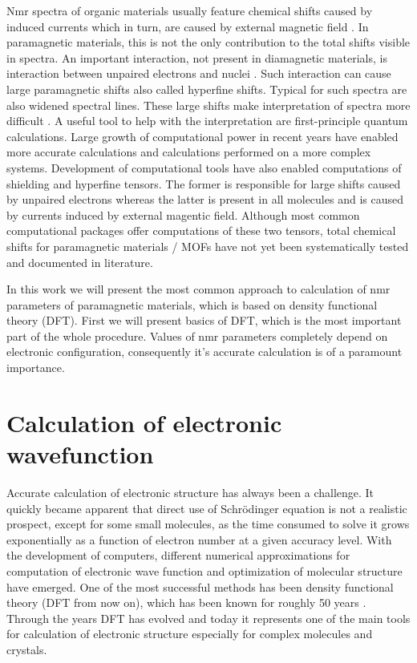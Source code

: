 \documentclass[openany, longbibliography,slovene,a4paper,12pt]{article}
\begin{document}
 Nmr spectra of organic materials usually feature chemical shifts caused by
 induced currents which in turn, are caused by external magnetic field
 \cite{chemic_shift_tensor_review}. In paramagnetic materials, this is not the
 only contribution to the total shifts visible in spectra. An important
 interaction, not present in  diamagnetic materials, is interaction between
 unpaired electrons and nuclei
 \cite{Dft_Investigation_of_the_Effect_of_Spin_Orbit}.
 Such interaction can cause large paramagnetic
 shifts also called hyperfine shifts. Typical for such spectra are also widened
 spectral lines. These large shifts make interpretation of spectra more difficult
 \cite{Dft_Investigation_of_the_Effect_of_Spin_Orbit}. A useful tool to help
 with the interpretation are first-principle quantum calculations. Large growth
 of computational power in recent years have enabled more accurate calculations
 and calculations performed on a more complex systems. Development of
 computational tools have also enabled computations of shielding and hyperfine
 tensors. The former is responsible for large shifts caused by unpaired
 electrons whereas the latter is present in all molecules and is caused by
 currents induced by external magentic field. Although most common computational
 packages offer computations of these two tensors, total chemical shifts for paramagnetic materials / MOFs have not yet been systematically tested and documented in literature.

 In this work we will present the most common approach to calculation of nmr
 parameters of paramagnetic materials,  which is based on density functional
 theory (DFT). First we  will present basics of DFT, which is the most important part of the whole procedure. Values of nmr parameters completely depend on electronic configuration, consequently it's accurate calculation is of a paramount importance. 

\section{Calculation of electronic wavefunction}
Accurate calculation of electronic structure has always been a challenge. It
quickly became apparent that direct use of Schr{\"o}dinger equation is not a
realistic prospect, except for some small
molecules, as the time consumed to solve it grows exponentially
\cite{nobel_lecture} as a function of electron
number at a given accuracy level. With the development of computers, different
numerical approximations for computation of electronic wave function and
optimization of molecular structure have emerged. One of the most successful methods has been density functional theory
(DFT from now on), which has been known for roughly 50 years \cite{nobel_lecture}. Through the years DFT has evolved and today it represents one of the main tools for calculation of electronic structure especially for complex molecules and crystals.
\end{document}
